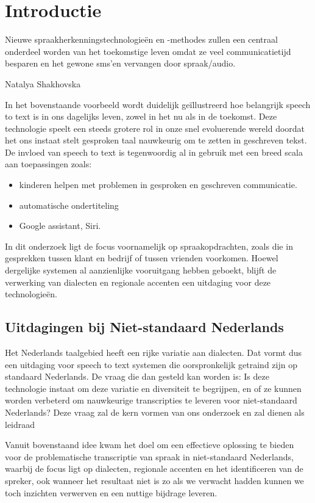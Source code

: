 
    

\section{Introductie}%
\label{sec:introductie}
\epigraph{Nieuwe spraakherkenningstechnologieën en -methodes zullen een centraal onderdeel worden van 
    het toekomstige leven omdat ze veel communicatietijd besparen en het gewone sms'en 
    vervangen door spraak/audio.}{Natalya Shakhovska}
    
In het bovenstaande voorbeeld wordt duidelijk geïllustreerd hoe belangrijk speech to text is in ons dagelijks leven, zowel in het nu als in de toekomst. Deze technologie speelt een steeds grotere rol in onze snel evoluerende wereld doordat het ons instaat stelt gesproken taal nauwkeurig om te zetten in geschreven tekst. De invloed van speech to text is tegenwoordig al in gebruik met een breed scala aan toepassingen zoals:
\begin{itemize}
    \item kinderen helpen met problemen in gesproken en geschreven communicatie\autocite{Kambouri2023}.
    \item automatische ondertiteling
    \item Google assistant, Siri.
\end{itemize}
In dit onderzoek ligt de focus voornamelijk op spraakopdrachten, zoals die in gesprekken tussen klant en bedrijf of tussen vrienden voorkomen. Hoewel dergelijke systemen al aanzienlijke vooruitgang hebben geboekt, blijft de verwerking van dialecten en regionale accenten een uitdaging voor deze technologieën.

\subsection{Uitdagingen bij Niet-standaard Nederlands}
Het Nederlands taalgebied heeft een rijke variatie aan dialecten. Dat vormt dus een uitdaging voor speech to text systemen die oorspronkelijk getraind zijn op standaard Nederlands. De vraag die dan gesteld kan worden is: Is deze technologie instaat om deze variatie en diversiteit te begrijpen, en of ze kunnen worden verbeterd om nauwkeurige transcripties te leveren voor niet-standaard Nederlands?
Deze vraag zal de kern vormen van ons onderzoek en zal dienen als leidraad

Vanuit bovenstaand idee kwam het doel om een effectieve oplossing te bieden voor de problematische transcriptie van spraak in niet-standaard Nederlands, waarbij de focus ligt op dialecten, regionale accenten en het identificeren van de spreker, ook wanneer het resultaat niet is zo als we verwacht hadden kunnen we toch inzichten verwerven en een nuttige bijdrage leveren.

